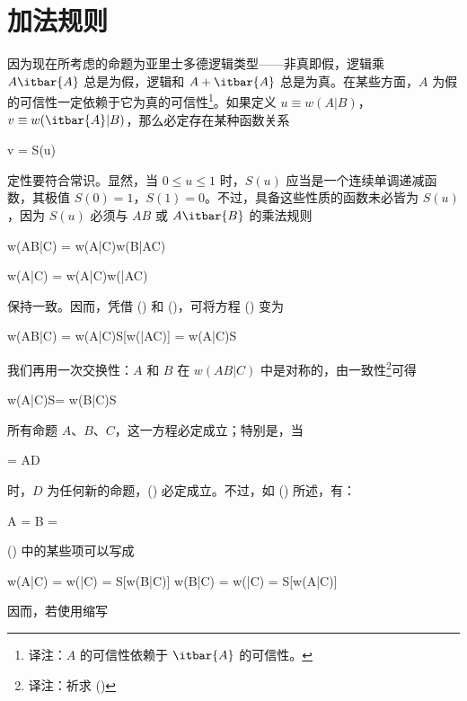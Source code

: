 \section{加法规则}

因为现在所考虑的命题为亚里士多德逻辑类型——非真即假，逻辑乘 $A\itbar{A}$ 总是为假，逻辑和 $A + \itbar{A}$ 总是为真。在某些方面，$A$ 为假的可信性一定依赖于它为真的可信性\footnote{译注：$A$ 的可信性依赖于 $\itbar{A}$ 的可信性。}。如果定义 $u\equiv w(A|B)$，$v\equiv w(\itbar{A}|B)$，那么必定存在某种函数关系

\placeformula[2-36]
\startformula
v = S(u)
\stopformula

定性要符合常识。显然，当 $0\le u\le 1$ 时，$S(u)$ 应当是一个连续单调递减函数，其极值 $S(0) = 1$，$S(1) = 0$。不过，具备这些性质的函数未必皆为 $S(u)$，因为 $S(u)$ 必须与 $AB$ 或 $A\itbar{B}$ 的乘法规则

\placeformula[2-37]
\startformula
w(AB|C) = w(A|C)w(B|AC)
\stopformula

\placeformula[2-38]
\startformula
w(A|C) =  w(A|C)w(|AC)
\stopalign
\stopformula

保持一致。因而，凭借 (\in[2-36]) 和 (\in[2-38])，可将方程 (\in[2-37]) 变为

\placeformula[2-39]
\startformula
w(AB|C) = w(A|C)S[w(|AC)] = w(A|C)S
\stopformula

我们再用一次交换性：$A$ 和 $B$ 在 $w(AB|C)$ 中是对称的，由一致性\footnote{译注：祈求 ()}可得

\placeformula[2-40]
\startformula
w(A|C)S = w(B|C)S
\stopformula

所有命题 $A$、$B$、$C$，这一方程必定成立；特别是，当

\placeformula[2-41]
\startformula
{} = AD
\stopformula

时，$D$ 为任何新的命题，(\in[2-40]) 必定成立。不过，如 (\in[1-13]) 所述，有：

\placeformula[2-42]
\startformula
A = \quad\quad B = 
\stopformula

(\in[2-40]) 中的某些项可以写成

\placeformula[2-43]
\startformula
\startmathalignment[n=3]
\NC w(A|C) \NC = w(|C) \NC = S[w(B|C)] \NR
\NC w(B|C) \NC = w(|C) \NC = S[w(A|C)] \NR
\stopmathalignment
\stopformula

因而，若使用缩写

